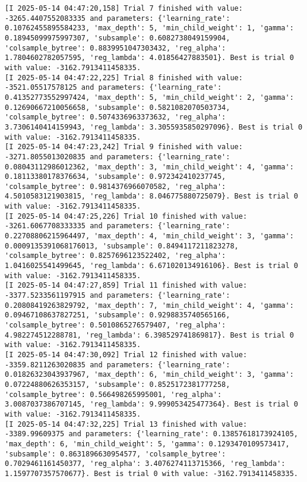 \documentclass[
  letterpaper,
  DIV=11,
  numbers=noendperiod]{scrreprt}
\begin{document}
\begin{verbatim}
[I 2025-05-14 04:47:20,158] Trial 7 finished with value: -3265.4407552083335 and parameters: {'learning_rate': 0.10762455895584233, 'max_depth': 5, 'min_child_weight': 1, 'gamma': 0.18945099975997307, 'subsample': 0.6082738049159904, 'colsample_bytree': 0.8839951047303432, 'reg_alpha': 1.7804602782057595, 'reg_lambda': 4.01856427883501}. Best is trial 0 with value: -3162.7913411458335.
[I 2025-05-14 04:47:22,225] Trial 8 finished with value: -3521.05517578125 and parameters: {'learning_rate': 0.41352773552997424, 'max_depth': 5, 'min_child_weight': 2, 'gamma': 0.12690667210056658, 'subsample': 0.5821082070503734, 'colsample_bytree': 0.5074336963373632, 'reg_alpha': 3.7306140414159943, 'reg_lambda': 3.3055935850297096}. Best is trial 0 with value: -3162.7913411458335.
[I 2025-05-14 04:47:23,242] Trial 9 finished with value: -3271.8055013020835 and parameters: {'learning_rate': 0.08043112986012362, 'max_depth': 3, 'min_child_weight': 4, 'gamma': 0.18113380178376634, 'subsample': 0.972342410237745, 'colsample_bytree': 0.9814376966070582, 'reg_alpha': 4.5010583121903815, 'reg_lambda': 8.046775880725079}. Best is trial 0 with value: -3162.7913411458335.
[I 2025-05-14 04:47:25,226] Trial 10 finished with value: -3261.6067708333335 and parameters: {'learning_rate': 0.22708806215964497, 'max_depth': 4, 'min_child_weight': 3, 'gamma': 0.0009135391068176013, 'subsample': 0.8494117211823278, 'colsample_bytree': 0.8257696123522402, 'reg_alpha': 1.0416025541499645, 'reg_lambda': 6.671020134916106}. Best is trial 0 with value: -3162.7913411458335.
[I 2025-05-14 04:47:27,859] Trial 11 finished with value: -3377.5233561197915 and parameters: {'learning_rate': 0.20808419263829792, 'max_depth': 7, 'min_child_weight': 4, 'gamma': 0.09467108637827251, 'subsample': 0.9298835740565166, 'colsample_bytree': 0.5010865276579407, 'reg_alpha': 4.982274512288781, 'reg_lambda': 6.398529741869817}. Best is trial 0 with value: -3162.7913411458335.
[I 2025-05-14 04:47:30,092] Trial 12 finished with value: -3359.8211263020835 and parameters: {'learning_rate': 0.01826323043937967, 'max_depth': 6, 'min_child_weight': 3, 'gamma': 0.07224880626353157, 'subsample': 0.8525172381777258, 'colsample_bytree': 0.566498265995001, 'reg_alpha': 3.0087037386707145, 'reg_lambda': 9.999053425477364}. Best is trial 0 with value: -3162.7913411458335.
[I 2025-05-14 04:47:32,225] Trial 13 finished with value: -3389.99609375 and parameters: {'learning_rate': 0.13857618173924105, 'max_depth': 6, 'min_child_weight': 5, 'gamma': 0.1293470109573417, 'subsample': 0.8631896630954577, 'colsample_bytree': 0.7029461161450377, 'reg_alpha': 3.4076274113715366, 'reg_lambda': 1.1597707357570677}. Best is trial 0 with value: -3162.7913411458335.

\end{verbatim}
\end{document}

